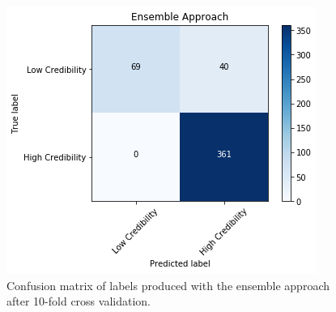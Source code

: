 \documentclass[a4paper,twoside,phd]{BYUPhys}
\begin{document}
\begin{table}[H]
	\centering
	\caption{Performance of low credibility identification task via an ensemble approach.}

	\label{table:EnsembleApproach}
\end{table}

\begin{figure}[H]
	\centering
	\includegraphics[totalheight=7cm]{images/ensemble-performance.png}
	\caption{Confusion matrix of labels produced with the ensemble approach after 10-fold cross validation.}
	\label{fig:EnsemblePerformance}
\end{figure}
\end{document}
